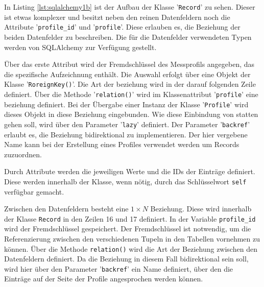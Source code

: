     
    
    In Listing \ref{lst:sqlalchemy1b} ist der Aufbau der Klasse '\texttt{Record}' zu sehen. Dieser ist etwas komplexer und besitzt neben den reinen Datenfeldern noch die Attribute '\texttt{profile\_id}' und '\texttt{profile}'. Diese erlauben es, die Beziehung der beiden Datenfelder zu beschreiben. Die für die Datenfelder verwendeten Typen werden von SQLAlchemy zur Verfügung gestellt.
    
    Über das erste Attribut wird der Fremdschlüssel des Messprofils angegeben, das die spezifische Aufzeichnung enthält. Die Auswahl erfolgt über eine Objekt der Klasse '\texttt{RoreignKey()}'. Die Art der beziehung wird in der darauf folgenden Zeile definiert. Über die Methode '\texttt{relation()}' wird im Klassenattribut '\texttt{profile}' eine beziehung definiert. Bei der Übergabe einer Instanz der Klasse '\texttt{Profile}' wird dieses Objekt in diese Beziehung eingebunden. Wie diese Einbindung von statten gehen soll, wird über den Parameter '\texttt{lazy}' definiert. Der Parameter '\texttt{backref}' erlaubt es, die Beziehung bidirektional zu implementieren. Der hier vergebene Name kann bei der Erstellung eines Profiles verwendet werden um Records zuzuordnen.
    
    
    Durch Attribute werden die jeweiligen Werte und die IDs der Einträge definiert.  Diese werden innerhalb der Klasse, wenn nötig, durch das Schlüsselwort \texttt{self} verfügbar gemacht.                                                                                                                                                                                                                                

    Zwischen den Datenfeldern besteht eine $1 \times N$ Beziehung. Diese wird innerhalb der Klasse \texttt{Record} in den Zeilen 16 und 17 definiert.  In der Variable \texttt{profile\_id} wird der Fremdschlüssel gespeichert. Der Fremdschlüssel ist notwendig, um die Referenzierung zwischen den verschiedenen Tupeln in den Tabellen vornehmen zu können. Über die Methode \texttt{relation()} wird die Art der Beziehung zwischen den Datenfeldern definiert. Da die Beziehung in diesem Fall bidirektional sein soll, wird hier über den Parameter '\texttt{backref}' ein Name definiert, über den die Einträge auf der Seite der Profile angesprochen werden können.
    
